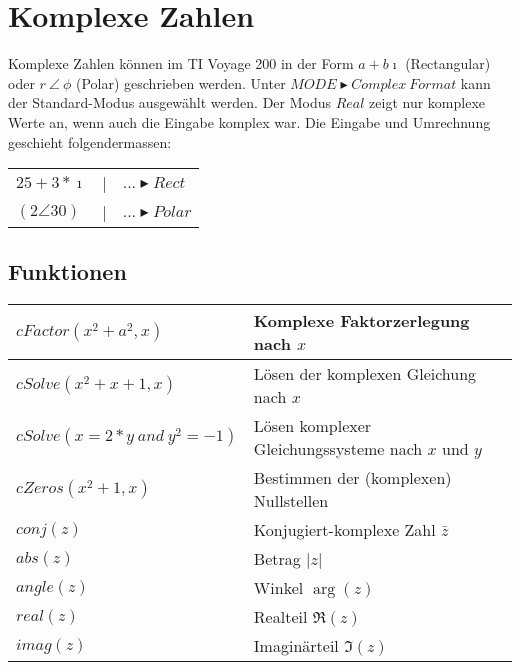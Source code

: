 \section{Komplexe Zahlen}

Komplexe Zahlen können im TI Voyage 200 in der Form $a+b\imath$ (Rectangular) oder 
$r \: \angle \: \phi$ (Polar) geschrieben werden. Unter 
$MODE \blacktriangleright Complex \ Format$ kann der Standard-Modus ausgewählt werden.
Der Modus $Real$ zeigt nur komplexe Werte an, wenn auch die Eingabe komplex war.
Die Eingabe und Umrechnung geschieht folgendermassen: \\
\begin{tabular}{l l l}
	$2 5+3*\imath$			& | & $... \blacktriangleright Rect$	\\
	$(2 \angle 30) $		& | & $... \blacktriangleright Polar$	\\
\end{tabular}

\subsection{Funktionen}
\begin{tabular}{|l|l|}
	\hline
	$cFactor(x^2+a^2,x)$								& Komplexe Faktorzerlegung nach $x$						\\ \hline
	$cSolve(x^2+x+1,x)$									& Lösen der komplexen Gleichung nach $x$				\\
	$cSolve(x=2*y \: and \: y^2=-1)$					& Lösen komplexer Gleichungssysteme nach $x$ und $y$	\\ \hline
	$cZeros(x^2+1,x)$									& Bestimmen der (komplexen) Nullstellen					\\ \hline
	$conj(z)$											& Konjugiert-komplexe Zahl $\bar{z}$					\\ \hline
	$abs(z)$											& Betrag $|z|$											\\ \hline
	$angle(z)$											& Winkel $\arg(z)$										\\ \hline
	$real(z)$											& Realteil $\Re(z)$										\\ \hline
	$imag(z)$											& Imaginärteil $\Im(z)$									\\ \hline
\end{tabular}

